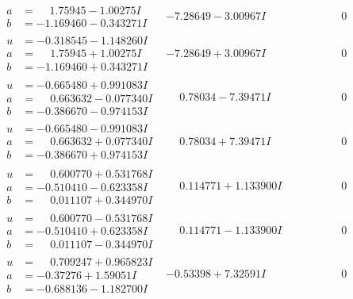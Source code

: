 \documentclass[1p]{elsarticle_modified}
\theoremstyle{definition}
\begin{document}
$$\begin{array}{c|c|c}
\begin{aligned}
a &= \phantom{-}1.75945 - 1.00275 I \\
b &= -1.169460 - 0.343271 I\end{aligned}
 & -7.28649 - 3.00967 I & \phantom{-0.000000 } 0 \\ \hline\begin{aligned}
u &= -0.318545 - 1.148260 I \\
a &= \phantom{-}1.75945 + 1.00275 I \\
b &= -1.169460 + 0.343271 I\end{aligned}
 & -7.28649 + 3.00967 I & \phantom{-0.000000 } 0 \\ \hline\begin{aligned}
u &= -0.665480 + 0.991083 I \\
a &= \phantom{-}0.663632 - 0.077340 I \\
b &= -0.386670 - 0.974153 I\end{aligned}
 & \phantom{-}0.78034 - 7.39471 I & \phantom{-0.000000 } 0 \\ \hline\begin{aligned}
u &= -0.665480 - 0.991083 I \\
a &= \phantom{-}0.663632 + 0.077340 I \\
b &= -0.386670 + 0.974153 I\end{aligned}
 & \phantom{-}0.78034 + 7.39471 I & \phantom{-0.000000 } 0 \\ \hline\begin{aligned}
u &= \phantom{-}0.600770 + 0.531768 I \\
a &= -0.510410 - 0.623358 I \\
b &= \phantom{-}0.011107 + 0.344970 I\end{aligned}
 & \phantom{-}0.114771 + 1.133900 I & \phantom{-0.000000 } 0 \\ \hline\begin{aligned}
u &= \phantom{-}0.600770 - 0.531768 I \\
a &= -0.510410 + 0.623358 I \\
b &= \phantom{-}0.011107 - 0.344970 I\end{aligned}
 & \phantom{-}0.114771 - 1.133900 I & \phantom{-0.000000 } 0 \\ \hline\begin{aligned}
u &= \phantom{-}0.709247 + 0.965823 I \\
a &= -0.37276 + 1.59051 I \\
b &= -0.688136 - 1.182700 I\end{aligned}
 & -0.53398 + 7.32591 I & \phantom{-0.000000 } 0 \\ \hline\begin{aligned}

\end{aligned}
\end{array}$$
\end{document}
